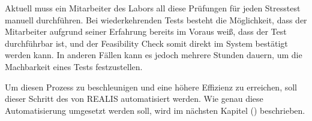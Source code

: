 Aktuell muss ein Mitarbeiter des Labors all diese Prüfungen für jeden Stresstest manuell durchführen. Bei wiederkehrenden Tests besteht die Möglichkeit, dass der Mitarbeiter aufgrund seiner Erfahrung bereits im Voraus weiß, dass der Test durchführbar ist, und der Feasibility Check somit direkt im System bestätigt werden kann. In anderen Fällen kann es jedoch mehrere Stunden dauern, um die Machbarkeit eines Tests festzustellen.

Um diesen Prozess zu beschleunigen und eine höhere Effizienz zu erreichen, soll dieser Schritt des  von \gls{REALIS} automatisiert werden. Wie genau diese Automatisierung umgesetzt werden soll, wird im nächsten Kapitel () beschrieben.
